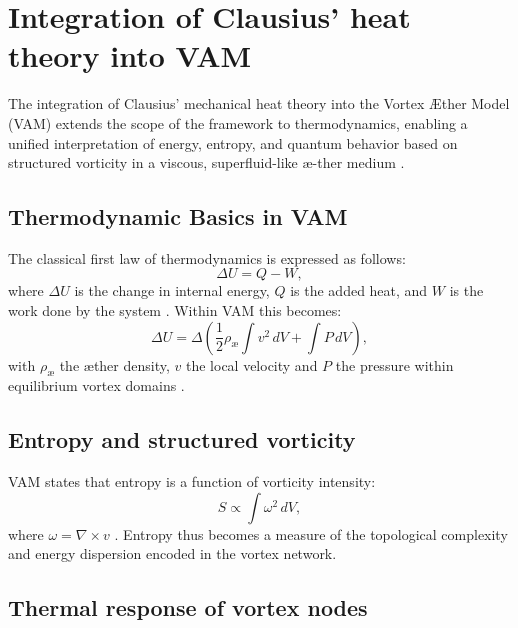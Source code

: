 \section{Integration of Clausius' heat theory into VAM}

The integration of Clausius' mechanical heat theory into the Vortex Æther Model (VAM) extends the scope of the framework to thermodynamics,
enabling a unified interpretation of energy, entropy, and quantum behavior based on structured vorticity in a viscous, superfluid-like \ae-ther
medium \cite{clausius1865mechanical, maxwell1865electromagnetic, helmholtz1858integrals}.

\subsection{Thermodynamic Basics in VAM}

The classical first law of thermodynamics is expressed as follows:
\begin{equation}
    \Delta U = Q - W,\label{eq:first_law_thermodynamics}
\end{equation}
where $\Delta U$ is the change in internal energy, $Q$ is the added heat, and $W$ is the work done by the system \cite{clausius1865mechanical}. Within VAM this becomes:
\begin{equation}
    \Delta U = \Delta \left( \frac{1}{2} \rho_{\text{\ae}} \int v^2 \, dV + \int P \, dV \right),\label{eq:first_law_vam}
\end{equation}
with $\rho_{\text{\ae}}$ the æther density, $v$ the local velocity and $P$ the pressure within equilibrium vortex domains \cite{vam2025unified}.

\subsection{Entropy and structured vorticity}

VAM states that entropy is a function of vorticity intensity:
\begin{equation}
    S \propto \int \omega^2 \, dV,\label{eq:entropy_vorticity}
\end{equation}
where $\omega = \nabla \times v$ \cite{kelvin1867vortex}. Entropy thus becomes a measure of the topological complexity and energy dispersion encoded in the vortex network.

\subsection{Thermal response of vortex nodes}

